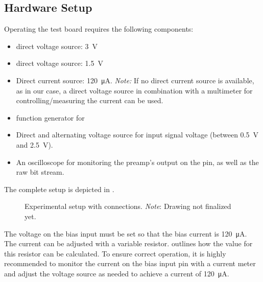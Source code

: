 \subsection{Hardware Setup}
\label{subsec:hardwareSetup}

Operating the test board requires the following components:

\begin{itemize}\tightlist
    \item
        direct voltage source: \SI{3}{\volt}
    \item
        direct voltage source: \SI{1.5}{\volt}
    \item
        Direct  current  source: \SI{120}{\micro\ampere}.  \emph{Note:} If  no
        direct current source  is available, as in our case,  a direct voltage
        source in combination with  a multimeter for controlling/measuring the
        current can be used.
    \item
        function generator for 
    \item
        Direct  and  alternating  voltage  source  for  input  signal  voltage
        (between \SI{0.5}{\volt} and \SI{2.5}{\volt}).
    \item
        An oscilloscope for monitoring the preamp's output on the  pin, as well as the raw bit stream.
\end{itemize}

The complete setup is depicted in .

\begin{figure}
    
    \caption{%
        Experimental setup  with connections.  \emph{Note}: Drawing not
        finalized yet.%
    }
    \label{fig:experimentDiagram}
\end{figure}

The  voltage  on  the  bias  input  must be  set  so  that  the  bias  current
is  \SI{120}{\micro\ampere}. The  current  can  be adjusted  with  a  variable
resistor. \cite{ref:burgherr} outlines how the  value for this resistor can be
calculated. To ensure correct  operation, it is highly  recommended to monitor
the current on the bias input pin  with a current meter and adjust the voltage
source as needed to  achieve a current of \SI{120}{\micro\ampere}.

